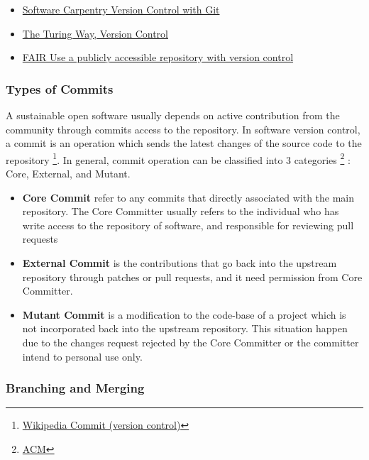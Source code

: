 \documentclass[
  letterpaper,
  DIV=11,
  numbers=noendperiod]{scrreport}
\providecommand{\tightlist}{%
  \setlength{\itemsep}{0pt}\setlength{\parskip}{0pt}}\usepackage{longtable,booktabs,array}
\begin{document}
\begin{itemize}
\tightlist
\item
  \href{https://swcarpentry.github.io/git-novice/}{Software Carpentry
  Version Control with Git}
\item
  \href{https://the-turing-way.netlify.app/reproducible-research/vcs.html}{The
  Turing Way, Version Control}
\item
  \href{https://fair-software.eu/recommendations/repository}{FAIR Use a
  publicly accessible repository with version control}
\end{itemize}

\hypertarget{types-of-commits}{%
\subsubsection{Types of Commits}\label{types-of-commits}}

A sustainable open software usually depends on active contribution from
the community through commits access to the repository. In software
version control, a commit is an operation which sends the latest changes
of the source code to the repository \footnote{\href{https://en.wikipedia.org/wiki/Commit_(version_control)}{Wikipedia
  Commit (version control)}}. In general, commit operation can be
classified into 3 categories \footnote{\href{https://dl.acm.org/doi/10.1145/2597073.2597113}{ACM}}
: Core, External, and Mutant.

\begin{itemize}
\item
  \textbf{Core Commit} refer to any commits that directly associated
  with the main repository. The Core Committer usually refers to the
  individual who has write access to the repository of software, and
  responsible for reviewing pull requests
\item
  \textbf{External Commit} is the contributions that go back into the
  upstream repository through patches or pull requests, and it need
  permission from Core Committer.
\item
  \textbf{Mutant Commit} is a modification to the code-base of a project
  which is not incorporated back into the upstream repository. This
  situation happen due to the changes request rejected by the Core
  Committer or the committer intend to personal use only.
\end{itemize}

\hypertarget{branching-and-merging}{%
\subsubsection{Branching and Merging}\label{branching-and-merging}}
\end{document}
